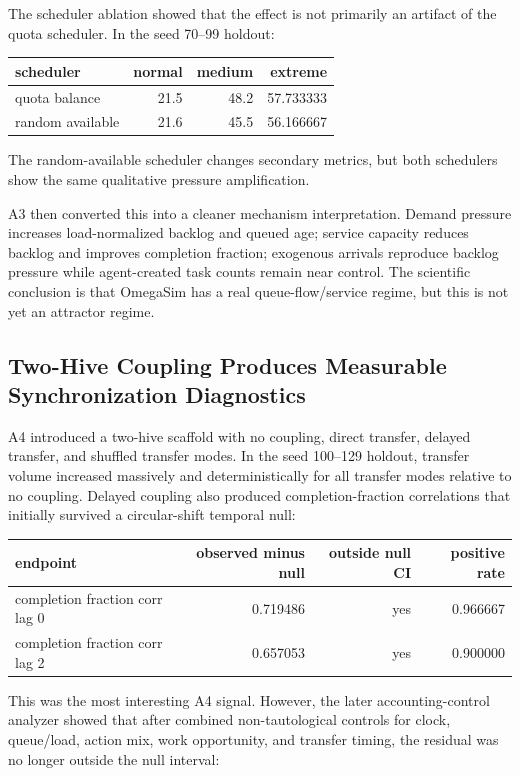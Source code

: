\documentclass[11pt]{article}
\begin{document}
The scheduler ablation showed that the effect is not primarily an artifact of
the quota scheduler. In the seed 70--99 holdout:

\begin{center}
\begin{tabular}{lrrr}
scheduler & normal & medium & extreme \\
\hline
quota balance & 21.5 & 48.2 & 57.733333 \\
random available & 21.6 & 45.5 & 56.166667 \\
\end{tabular}
\end{center}

The random-available scheduler changes secondary metrics, but both schedulers
show the same qualitative pressure amplification.

A3 then converted this into a cleaner mechanism interpretation. Demand
pressure increases load-normalized backlog and queued age; service capacity
reduces backlog and improves completion fraction; exogenous arrivals reproduce
backlog pressure while agent-created task counts remain near control. The
scientific conclusion is that OmegaSim has a real queue-flow/service regime,
but this is not yet an attractor regime.

\subsection{Two-Hive Coupling Produces Measurable Synchronization Diagnostics}

A4 introduced a two-hive scaffold with no coupling, direct transfer, delayed
transfer, and shuffled transfer modes. In the seed 100--129 holdout, transfer
volume increased massively and deterministically for all transfer modes
relative to no coupling. Delayed coupling also produced completion-fraction
correlations that initially survived a circular-shift temporal null:

\begin{center}
\begin{tabular}{lrrr}
endpoint & observed minus null & outside null CI & positive rate \\
\hline
completion fraction corr lag 0 & 0.719486 & yes & 0.966667 \\
completion fraction corr lag 2 & 0.657053 & yes & 0.900000 \\
\end{tabular}
\end{center}

This was the most interesting A4 signal. However, the later accounting-control
analyzer showed that after combined non-tautological controls for clock,
queue/load, action mix, work opportunity, and transfer timing, the residual was
no longer outside the null interval:
\end{document}

